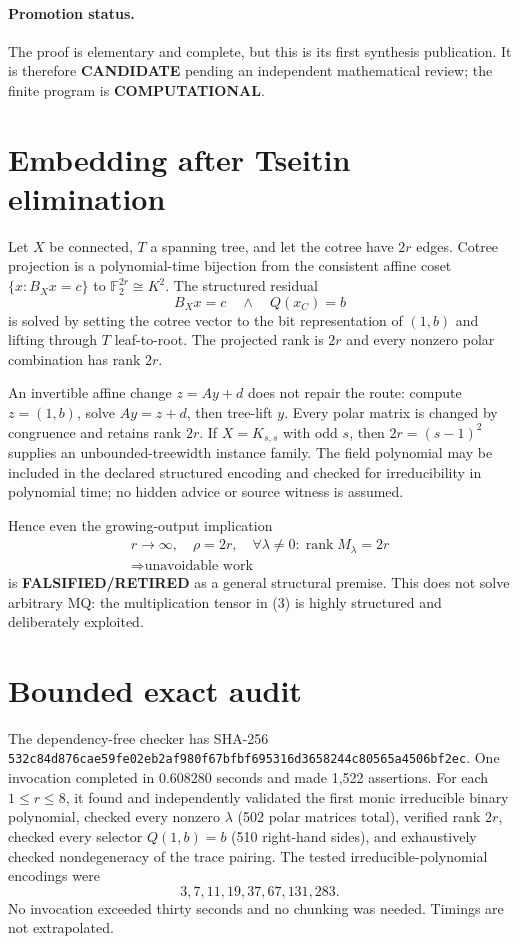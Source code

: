 \documentclass[11pt]{article}
\newcommand{\F}{\mathbb F_2}
\newcommand{\COMP}{\textbf{COMPUTATIONAL}}
\newcommand{\CAND}{\textbf{CANDIDATE}}
\newcommand{\RET}{\textbf{FALSIFIED/RETIRED}}
\begin{document}
\paragraph{Promotion status.}
The proof is elementary and complete, but this is its first synthesis
publication.  It is therefore \CAND{} pending an independent mathematical
review; the finite program is \COMP{}.

\section{Embedding after Tseitin elimination}
Let $X$ be connected, $T$ a spanning tree, and let the cotree have
$2r$ edges.  Cotree projection is a polynomial-time bijection from the
consistent affine coset $\{x:B_Xx=c\}$ to $\F^{2r}\cong K^2$.  The structured
residual
\[
B_Xx=c\quad\land\quad Q(x_C)=b                          \tag{7}
\]
is solved by setting the cotree vector to the bit representation of $(1,b)$
and lifting through $T$ leaf-to-root.  The projected rank is $2r$ and every
nonzero polar combination has rank $2r$.

An invertible affine change $z=Ay+d$ does not repair the route: compute
$z=(1,b)$, solve $Ay=z+d$, then tree-lift $y$.  Every polar matrix is changed
by congruence and retains rank $2r$.  If $X=K_{s,s}$ with odd $s$, then
$2r=(s-1)^2$ supplies an unbounded-treewidth instance family.  The field
polynomial may be included in the declared structured encoding and checked
for irreducibility in polynomial time; no hidden advice or source witness is
assumed.

Hence even the growing-output implication
\[
\begin{gathered}
r\to\infty,\quad \rho=2r,\quad
\forall\lambda\ne0:\operatorname{rank}M_\lambda=2r
\\[-2mm]
\Longrightarrow\text{unavoidable work}
\end{gathered}                                            \tag{8}
\]
is \RET{} as a general structural premise.  This does not solve arbitrary
MQ: the multiplication tensor in (3) is highly structured and deliberately
exploited.

\section{Bounded exact audit}
The dependency-free checker
has SHA-256
\texttt{532c84d876cae59fe02eb2af980f67bfbf695316d3658244c80565a4506bf2ec}.
One invocation completed in 0.608280 seconds and made 1,522 assertions.
For each $1\le r\le8$, it found and independently validated the first monic
irreducible binary polynomial, checked every nonzero $\lambda$ (502 polar
matrices total), verified rank $2r$, checked every selector $Q(1,b)=b$ (510
right-hand sides), and exhaustively checked nondegeneracy of the trace pairing.
The tested irreducible-polynomial encodings were
\[
3,7,11,19,37,67,131,283.
\]
No invocation exceeded thirty seconds and no chunking was needed.  Timings
are not extrapolated.
\end{document}
